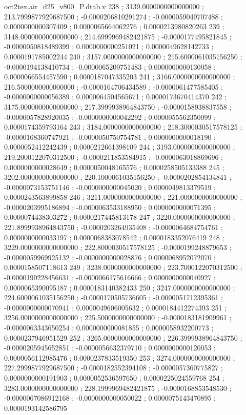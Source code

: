 \begin{filecontents}[overwrite]{oct2tex.air_d25_v800_P.dtab.v}
238 ; 3139.0000000000000000 ; 213.7999877929687500 ; -0.0000206810291274 ; -0.0000059049707488 ; 0.0000000000307409 ; 0.0000065664062276 ; 0.0000213980820263
239 ; 3148.0000000000000000 ; 214.6999969482421875 ; -0.0000177495821845 ; -0.0000050818489399 ; 0.0000000000251021 ; 0.0000049628142733 ; 0.0000191785002244
240 ; 3157.0000000000000000 ; 215.6000061035156250 ; -0.0000194138410734 ; -0.0000065209751483 ; 0.0000000000130058 ; 0.0000066554457590 ; 0.0000187047335203
241 ; 3166.0000000000000000 ; 216.5000000000000000 ; -0.0000164706434589 ; -0.0000061477585405 ; -0.0000000000056389 ; 0.0000064504565671 ; 0.0000173670414370
242 ; 3175.0000000000000000 ; 217.3999938964843750 ; -0.0000158938837558 ; -0.0000057828920035 ; -0.0000000000042292 ; 0.0000055562350099 ; 0.0000174359793164
243 ; 3184.0000000000000000 ; 218.3000030517578125 ; -0.0000168360747921 ; -0.0000050750754781 ; 0.0000000000018190 ; 0.0000052412242439 ; 0.0000212661398109
244 ; 3193.0000000000000000 ; 219.2000122070312500 ; -0.0000211853584915 ; -0.0000063018869696 ; 0.0000000000028649 ; 0.0000050048165576 ; 0.0000258505133388
245 ; 3202.0000000000000000 ; 220.1000061035156250 ; -0.0000202854134841 ; -0.0000073153751146 ; -0.0000000000045020 ; 0.0000049813379519 ; 0.0000243563899858
246 ; 3211.0000000000000000 ; 221.0000000000000000 ; -0.0000203995186894 ; -0.0000063533188950 ; 0.0000000000071395 ; 0.0000074438303272 ; 0.0000217445813178
247 ; 3220.0000000000000000 ; 221.8999938964843750 ; -0.0000203264935408 ; -0.0000064684754761 ; 0.0000000000033197 ; 0.0000068383078542 ; 0.0000183352076419
248 ; 3229.0000000000000000 ; 222.8000030517578125 ; -0.0000199248879653 ; -0.0000059969925132 ; -0.0000000000028876 ; 0.0000068952072070 ; 0.0000158507118613
249 ; 3238.0000000000000000 ; 223.7000122070312500 ; -0.0000190228456631 ; -0.0000066175616666 ; 0.0000000000040927 ; 0.0000065390095187 ; 0.0000183140382433
250 ; 3247.0000000000000000 ; 224.6000061035156250 ; -0.0000170505736605 ; -0.0000051712395361 ; -0.0000000000070941 ; 0.0000049606005632 ; 0.0000184412274393
251 ; 3256.0000000000000000 ; 225.5000000000000000 ; -0.0000183181909961 ; -0.0000063343650254 ; 0.0000000000081855 ; 0.0000058932200773 ; 0.0000237946951529
252 ; 3265.0000000000000000 ; 226.3999938964843750 ; -0.0000205945652851 ; -0.0000056632379710 ; 0.0000000000120053 ; 0.0000056112985476 ; 0.0000237833519350
253 ; 3274.0000000000000000 ; 227.2999877929687500 ; -0.0000182552394108 ; -0.0000057360775827 ; 0.0000000000191903 ; 0.0000052536597650 ; 0.0000225024559768
254 ; 3283.0000000000000000 ; 228.1999969482421875 ; -0.0000168853548530 ; -0.0000067086912168 ; -0.0000000000050022 ; 0.0000075143470895 ; 0.0000193142586795

\end{filecontents}
